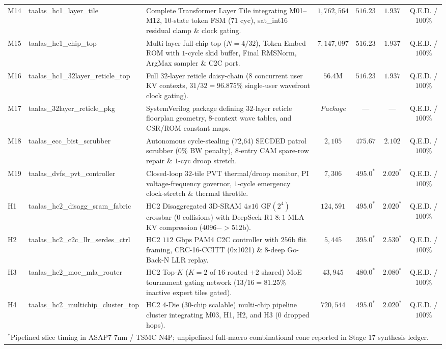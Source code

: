 \documentclass[10pt,journal,compsoc]{IEEEtran}
\def\texttt#1{#1}%
\def\to{->}%
\def\times{x}%
\begin{document}
\begin{table}[!t]
{\begin{tabular}{llp{6.6cm}cccc}
\texttt{M14} & \texttt{taalas\_hc1\_layer\_tile} & Complete Transformer Layer Tile integrating \texttt{M01}--\texttt{M12}, $10$-state token FSM ($71\text{ cyc}$), \texttt{sat\_int16} residual clamp \& clock gating. & $1,762,564$ & $516.23$ & $1.937$ & \texttt{Q.E.D.} / $100\%$ \\
\texttt{M15} & \texttt{taalas\_hc1\_chip\_top} & Multi-layer full-chip top ($N=4/32$), Token Embed ROM with $1$-cycle skid buffer, Final RMSNorm, ArgMax sampler \& C2C port. & $7,147,097$ & $516.23$ & $1.937$ & \texttt{Q.E.D.} / $100\%$ \\
\texttt{M16} & \texttt{taalas\_hc1\_32layer\_reticle\_top} & Full $32$-layer reticle daisy-chain ($8$ concurrent user KV contexts, $31/32 = 96.875\%$ single-user wavefront clock gating). & $56.4\text{M}$ & $516.23$ & $1.937$ & \texttt{Q.E.D.} / $100\%$ \\
\texttt{M17} & \texttt{taalas\_32layer\_reticle\_pkg} & SystemVerilog package defining $32$-layer reticle floorplan geometry, $8$-context wave tables, and CSR/ROM constant maps. & \emph{Package} & --- & --- & \texttt{Q.E.D.} / $100\%$ \\
\texttt{M18} & \texttt{taalas\_ecc\_bist\_scrubber} & Autonomous cycle-stealing \texttt{(72,64)} SECDED patrol scrubber ($0\%$ BW penalty), $8$-entry CAM spare-row repair \& $1$-cyc droop stretch. & $2,105$ & $475.67$ & $2.102$ & \texttt{Q.E.D.} / $100\%$ \\
\texttt{M19} & \texttt{taalas\_dvfs\_pvt\_controller} & Closed-loop $32$-tile PVT thermal/droop monitor, PI voltage-frequency governor, $1$-cycle emergency clock-stretch \& thermal throttle. & $7,306$ & $495.0^*$ & $2.020^*$ & \texttt{Q.E.D.} / $100\%$ \\
\texttt{H1} & \texttt{taalas\_hc2\_disagg\_sram\_fabric} & HC2 Disaggregated 3D-SRAM $4\times 16$ $\text{GF}(2^4)$ crossbar ($0$ collisions) with DeepSeek-R1 $8:1$ MLA KV compression ($4096\to 512\text{b}$). & $124,591$ & $495.0^*$ & $2.020^*$ & \texttt{Q.E.D.} / $100\%$ \\
\texttt{H2} & \texttt{taalas\_hc2\_c2c\_llr\_serdes\_ctrl} & HC2 $112\text{ Gbps}$ PAM4 C2C controller with $256\text{b}$ flit framing, \texttt{CRC-16-CCITT} (\texttt{0x1021}) \& $8$-deep Go-Back-N LLR replay. & $5,445$ & $395.0^*$ & $2.530^*$ & \texttt{Q.E.D.} / $100\%$ \\
\texttt{H3} & \texttt{taalas\_hc2\_moe\_mla\_router} & HC2 Top-$K$ ($K=2$ of $16$ routed $+ 2$ shared) MoE tournament gating network ($13/16 = 81.25\%$ inactive expert tiles gated). & $43,945$ & $480.0^*$ & $2.080^*$ & \texttt{Q.E.D.} / $100\%$ \\
\texttt{H4} & \texttt{taalas\_hc2\_multichip\_cluster\_top} & HC2 $4$-Die ($30$-chip scalable) multi-chip pipeline cluster integrating \texttt{M03}, \texttt{H1}, \texttt{H2}, and \texttt{H3} ($0$ dropped hops). & $720,544$ & $495.0^*$ & $2.020^*$ & \texttt{Q.E.D.} / $100\%$ \\
\bottomrule
\multicolumn{7}{l}{\footnotesize $^*$Pipelined slice timing in ASAP7 $7\text{nm}$ / TSMC N4P; unpipelined full-macro combinational cone reported in Stage 17 synthesis ledger.}
\end{tabular}}
\end{table}
\end{document}
